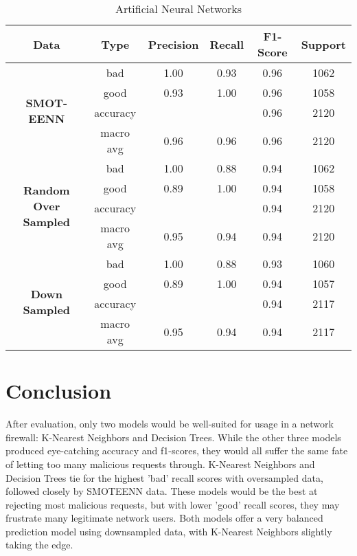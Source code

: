 \documentclass[conference]{IEEEtran}
\begin{document}
    \begin{table}[!t]
        \renewcommand{\arraystretch}{1.25}
        \caption{Artificial Neural Networks}
        \label{table:ann}
        \centering
        \begin{tabular}{ |c|c|c|c|c|c| }
            \hline
                \textbf{Data} & \textbf{Type} & \textbf{Precision} & \textbf{Recall} & \textbf{F1-Score} & \textbf{Support} \\
            \hline
                \multirow{4}{1.1cm}{\centering \textbf{SMOT-EENN}} & bad & 1.00 & 0.93 & 0.96 & 1062 \\
            \cline{2-6}
                 & good & 0.93 & 1.00 & 0.96 & 1058\\
            \cline{2-6}
                 & accuracy &  &  & 0.96 & 2120 \\
            \cline{2-6}
                 & macro avg & 0.96 & 0.96 & 0.96 & 2120 \\
            \hline
                \multirow{4}{1.1cm}{\centering \textbf{Random Over Sampled}} & bad & 1.00 & 0.88 & 0.94 & 1062 \\
            \cline{2-6}
                 & good & 0.89 & 1.00 & 0.94 & 1058 \\
            \cline{2-6}
                 & accuracy &  &  & 0.94 & 2120 \\
            \cline{2-6}
                 & macro avg & 0.95 & 0.94 & 0.94 & 2120 \\
            \hline
                \multirow{4}{1.1cm}{\centering \textbf{ \textbf{Down Sampled}}} & bad & 1.00 & 0.88 & 0.93 & 1060 \\
            \cline{2-6}
                 & good & 0.89 & 1.00 & 0.94 & 1057 \\
            \cline{2-6}
                 & accuracy &  &  & 0.94 & 2117 \\
            \cline{2-6}
                 & macro avg & 0.95 & 0.94 & 0.94 & 2117 \\
            \hline
        \end{tabular}
    \end{table}
        
\section{Conclusion}
After evaluation, only two models would be well-suited for usage in a network firewall: K-Nearest Neighbors and Decision Trees. While the other three models produced eye-catching accuracy and f1-scores, they would all suffer the same fate of letting too many malicious requests through. K-Nearest Neighbors and Decision Trees tie for the highest 'bad' recall scores with oversampled data, followed closely by SMOTEENN data. These models would be the best at rejecting most malicious requests, but with lower 'good' recall scores, they may frustrate many legitimate network users. Both models offer a very balanced prediction model using downsampled data, with K-Nearest Neighbors slightly taking the edge.
\end{document}
